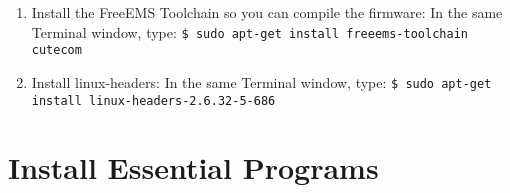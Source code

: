 \documentclass[12pt,notitlepage,onecolumn,oneside,openany]{memoir}
\begin{document}
\begin{enumerate}
\item \textsf{Install the FreeEMS Toolchain so you can compile the firmware:} \newline
      \textsf{In the same Terminal window, type:} \newline
      \texttt{\$ sudo apt-get install freeems-toolchain cutecom}

\item \textsf{Install linux-headers:} \newline
      \textsf{In the same Terminal window, type:} \newline
      \texttt{\$ sudo apt-get install linux-headers-2.6.32-5-686}
\end{enumerate}

\chapter{\textsf{Install Essential Programs}}
\end{document}
